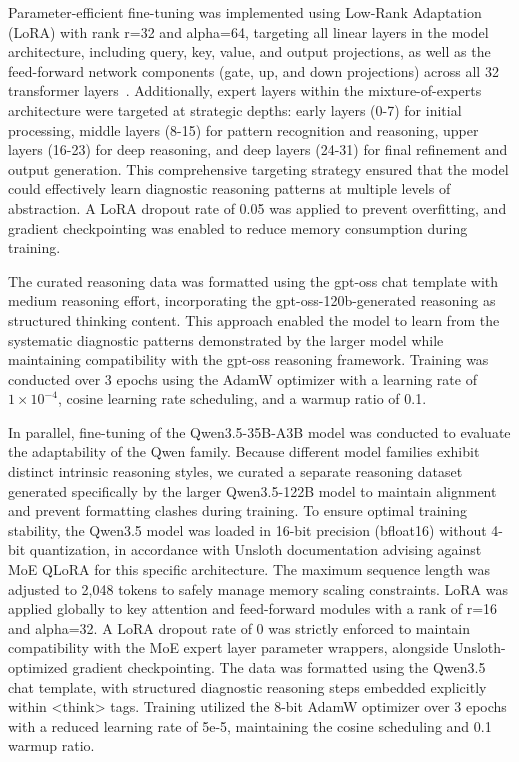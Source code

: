 \documentclass[10pt,journal,compsoc, onecolumn]{IEEEtran}
\begin{document}
Parameter-efficient fine-tuning was implemented using Low-Rank Adaptation (LoRA) with rank r=32 and alpha=64, targeting all linear layers in the model architecture, including query, key, value, and output projections, as well as the feed-forward network components (gate, up, and down projections) across all 32 transformer layers~\cite{hu2022lora, gao2025loraperiop,le2025impact}. Additionally, expert layers within the mixture-of-experts architecture were targeted at strategic depths: early layers (0-7) for initial processing, middle layers (8-15) for pattern recognition and reasoning, upper layers (16-23) for deep reasoning, and deep layers (24-31) for final refinement and output generation. This comprehensive targeting strategy ensured that the model could effectively learn diagnostic reasoning patterns at multiple levels of abstraction. A LoRA dropout rate of 0.05 was applied to prevent overfitting, and gradient checkpointing was enabled to reduce memory consumption during training.

The curated reasoning data was formatted using the gpt-oss chat template with medium reasoning effort, incorporating the gpt-oss-120b-generated reasoning as structured thinking content. This approach enabled the model to learn from the systematic diagnostic patterns demonstrated by the larger model while maintaining compatibility with the gpt-oss reasoning framework. Training was conducted over 3 epochs using the AdamW optimizer with a learning rate of $1 \times 10^{-4}$, cosine learning rate scheduling, and a warmup ratio of 0.1. 

In parallel, fine-tuning of the Qwen3.5-35B-A3B model was conducted to evaluate the adaptability of the Qwen family. Because different model families exhibit distinct intrinsic reasoning styles, we curated a separate reasoning dataset generated specifically by the larger Qwen3.5-122B model to maintain alignment and prevent formatting clashes during training. To ensure optimal training stability, the Qwen3.5 model was loaded in 16-bit precision (bfloat16) without 4-bit quantization, in accordance with Unsloth documentation advising against MoE QLoRA for this specific architecture. The maximum sequence length was adjusted to 2,048 tokens to safely manage memory scaling constraints. LoRA was applied globally to key attention and feed-forward modules with a rank of r=16 and alpha=32. A LoRA dropout rate of 0 was strictly enforced to maintain compatibility with the MoE expert layer parameter wrappers, alongside Unsloth-optimized gradient checkpointing. The data was formatted using the Qwen3.5 chat template, with structured diagnostic reasoning steps embedded explicitly within <think> tags. Training utilized the 8-bit AdamW optimizer over 3 epochs with a reduced learning rate of 5e-5, maintaining the cosine scheduling and 0.1 warmup ratio.
\end{document}
